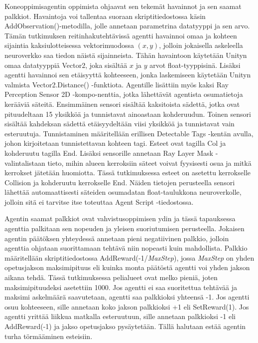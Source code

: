 \documentclass[utf8]{gradu3}
\begin{document}
Koneoppimisagentin oppimista ohjaavat sen tekemät havainnot ja sen saamat palkkiot. Havaintoja voi tallentaa suoraan skriptitiedostossa käsin AddObservation()-metodilla, jolle annetaan parametrina datatyyppi ja sen arvo. Tämän tutkimuksen reitinhakutehtävissä agentti havainnoi omaa ja kohteen sijaintia kaksiulotteisessa vektorimuodossa \((x,y)\), jolloin jokaisella askeleella neuroverkko saa tiedon näistä sijainneista. Tähän havaintoon käytetään Unityn omaa datatyyppiä Vector2, joka sisältää \(x\) ja \(y\) arvot float-tyyppisinä. Lisäksi agentti havainnoi sen etäisyyttä kohteeseen, jonka laskemiseen käytetään Unityn valmista Vector2.Distance() -funktiota. Agentille lisättiin myös kaksi Ray Perception Sensor 2D -kompo-nenttia, jotka lähettävät agentista osumatietoja kerääviä säteitä. Ensimmäinen sensori sisältää kaksitoista sädettä, jotka ovat pituudeltaan 15 yksikköä ja tunnistavat ainoastaan kohderuudun. Toinen sensori sisältää kahdeksan sädettä etäisyydeltään viisi yksikköä ja tunnistavat vain esteruutuja. Tunnistaminen määritellään erillisen Detectable Tags -kentän avulla, johon kirjoitetaan tunnistettavan kohteen tagi. Esteet ovat tagilla Col ja kohderuutu tagilla End. Lisäksi sensorille annetaan Ray Layer Mask -valintalistaan tieto, mihin alueen kerroksiin säteet voivat fyysisesti osua ja mitkä kerrokset jätetään huomiotta. Tässä tutkimuksessa esteet on asetettu kerrokselle Collision ja kohderuutu kerrokselle End. Näiden tietojen perusteella sensori lähettää automaattisesti säteiden osumadatan float-taulukkona neuroverkolle, jolloin sitä ei tarvitse itse toteuttaa Agent Script -tiedostossa.

Agentin saamat palkkiot ovat vahvistusoppimisen ydin ja tässä tapauksessa agenttia palkitaan sen nopeuden ja yleisen suoriutumisen perusteella. Jokaisen agentin päätöksen yhteydessä annetaan pieni negatiivinen palkkio, jolloin agenttia ohjataan suorittamaan tehtävä niin nopeasti kuin mahdollista. Palkkio määritellään skriptitiedostossa AddReward(-1/\textit{MaxStep}), jossa \textit{MaxStep} on yhden opetusjakson maksimipituus eli kuinka monta päätöstä agentti voi yhden jakson aikana tehdä. Tässä tutkimuksessa pelialueet ovat melko pieniä, joten maksimipituudeksi asetettiin 1000. Jos agentti ei saa suoritettua tehtävää ja maksimi askelmäärä saavutetaan, agentti saa palkkioksi yhteensä -1. Jos agentti osuu kohteeseen, sille annetaan koko jakson palkkioksi +1 eli SetReward(1). Jos agentti yrittää liikkua matkalla esteruutuun, sille annetaan palkkioksi -1 eli AddReward(-1) ja jakso opetusjakso pysäytetään. Tällä halutaan estää agentin turha törmääminen esteisiin.
\end{document}
